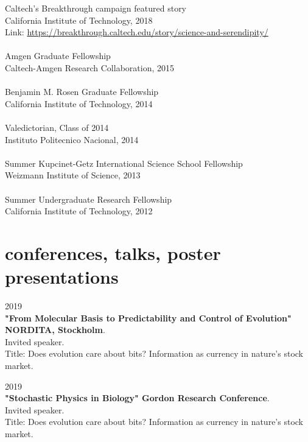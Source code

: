 \documentclass[]{friggeri-cv}
\begin{document}
Caltech's Breakthrough campaign featured story\\
{California Institute of Technology, 2018}\\
Link: \url{https://breakthrough.caltech.edu/story/science-and-serendipity/}\\
\\
Amgen Graduate Fellowship\\
{Caltech-Amgen Research Collaboration, 2015}\\
\\
Benjamin M. Rosen Graduate Fellowship\\
{California Institute of Technology, 2014}\\
\\
Valedictorian, Class of 2014\\
{Instituto Politecnico Nacional, 2014}\\
\\
Summer Kupcinet-Getz International Science School Fellowship\\
{Weizmann Institute of Science, 2013}\\
\\
Summer Undergraduate Research Fellowship\\
{California Institute of Technology, 2012}\\


\section{conferences, talks, poster presentations}

{\small{} 2019}\\
\textbf{"From Molecular Basis to Predictability and Control of Evolution" NORDITA, Stockholm}.\\
{Invited speaker.}\\
Title: Does evolution care about bits? Information as currency in nature's stock market.

{\small{} 2019}\\
\textbf{"Stochastic Physics in Biology" Gordon Research Conference}.\\
{Invited speaker.}\\
Title: Does evolution care about bits? Information as currency in nature's stock market.
\end{document}
